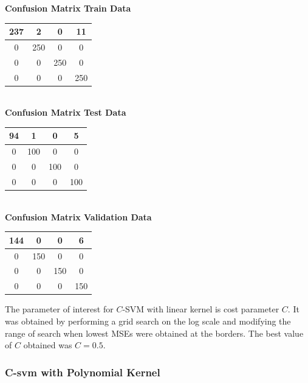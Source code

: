 \documentclass{article}
\begin{document}
\begin{flushleft}
\textbf{Confusion Matrix Train Data\\[5pt]}
\begin{tabular}{|c|c|c|c|}
\hline
237 & 2 & 0 & 11 \\
\hline
0 & 250 & 0 & 0 \\
\hline
0 & 0 & 250 & 0 \\
\hline
0 & 0 & 0 & 250 \\
\hline
\end{tabular}
\textbf{\\[10pt] Confusion Matrix Test Data \\[5pt]}
\begin{tabular}{|c|c|c|c|}
\hline
94 & 1 & 0 & 5 \\
\hline
0 & 100 & 0 & 0 \\
\hline
0 & 0 & 100 & 0 \\
\hline
0 & 0 & 0 & 100 \\
\hline
\end{tabular}
\textbf{\\[10pt] Confusion Matrix Validation Data \\[5pt]}
\begin{tabular}{|c|c|c|c|}
\hline
144 & 0 & 0 & 6 \\
\hline
0 & 150 & 0 & 0 \\
\hline
0 & 0 & 150 & 0 \\
\hline
0 & 0 & 0 & 150 \\
\hline
\end{tabular}
\end{flushleft}


The parameter of interest for $C$-SVM with linear kernel is cost parameter $C$. It was obtained by performing a grid search on the log scale and modifying the range of search when lowest MSEs were obtained at the borders.
The best value of $C$ obtained was $C=0.5$. 


\subsubsection{C-svm with Polynomial Kernel}
\end{document}
